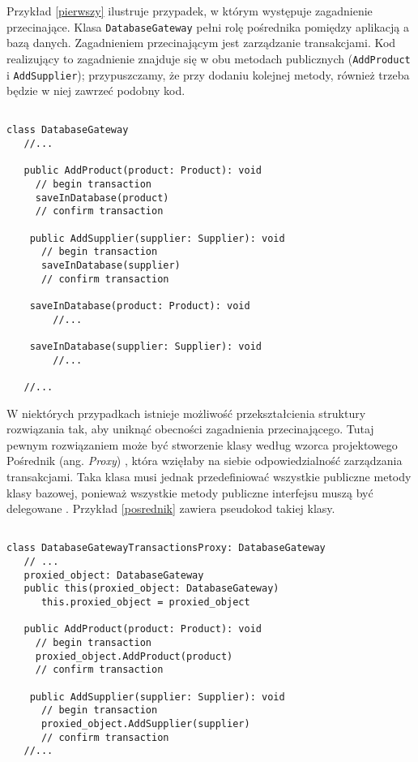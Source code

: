 \documentclass[a4paper,12pt]{mwbk}
\begin{document}
Przykład \ref{pierwszy} ilustruje przypadek, w którym występuje zagadnienie
przecinające. Klasa \lstinline!DatabaseGateway! pełni rolę pośrednika pomiędzy
aplikacją a bazą danych. Zagadnieniem przecinającym jest zarządzanie
transakcjami.  Kod realizujący to zagadnienie znajduje się w obu metodach
publicznych (\lstinline!AddProduct! i \lstinline!AddSupplier!); przypuszczamy,
że przy dodaniu kolejnej metody, również trzeba będzie w niej zawrzeć podobny
kod.


\begin{lstlisting}[style=AspectJ,caption=Zagadnienie przecinające,label=pierwszy]

class DatabaseGateway
   //...

   public AddProduct(product: Product): void
     // begin transaction
     saveInDatabase(product)
     // confirm transaction

    public AddSupplier(supplier: Supplier): void
      // begin transaction
      saveInDatabase(supplier)
      // confirm transaction

    saveInDatabase(product: Product): void
        //...

    saveInDatabase(supplier: Supplier): void
        //...

   //...
\end{lstlisting}

W niektórych przypadkach istnieje możliwość przekształcienia struktury
rozwiązania tak, aby uniknąć obecności zagadnienia przecinającego. Tutaj
pewnym rozwiązaniem może być stworzenie klasy według wzorca projektowego
Pośrednik (ang. \emph{Proxy}) \cite{GoF}, która wzięłaby na siebie
odpowiedzialność zarządzania transakcjami.  Taka klasa musi jednak
przedefiniować wszystkie publiczne metody klasy bazowej, ponieważ wszystkie
metody publiczne interfejsu muszą być delegowane \cite{GoF}. Przykład
\ref{posrednik} zawiera pseudokod takiej klasy.

\begin{lstlisting}[style=AspectJ,caption=Pośrednik zarządzający transakcjami,label=posrednik]

class DatabaseGatewayTransactionsProxy: DatabaseGateway
   // ...
   proxied_object: DatabaseGateway
   public this(proxied_object: DatabaseGateway)
      this.proxied_object = proxied_object

   public AddProduct(product: Product): void
     // begin transaction
     proxied_object.AddProduct(product)
     // confirm transaction

    public AddSupplier(supplier: Supplier): void
      // begin transaction
      proxied_object.AddSupplier(supplier)
      // confirm transaction
   //...
\end{lstlisting}
\end{document}
